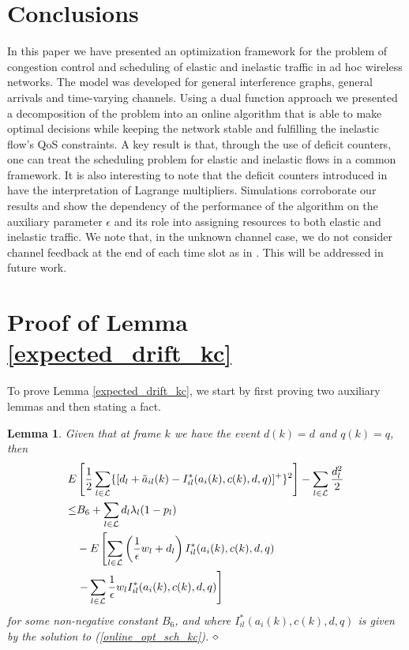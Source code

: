 \documentclass[conference]{IEEEtran}
\newtheorem{lemma}{Lemma}
\begin{document}
\section{Conclusions}

In this paper we have presented an optimization framework for the problem of congestion control and scheduling of elastic and inelastic traffic in ad hoc wireless networks. The model was developed for general interference graphs, general arrivals and time-varying channels. Using a dual function approach we presented a decomposition of the problem into an online algorithm that is able to make optimal decisions while keeping the network stable and fulfilling the inelastic flow's QoS constraints. A key result is that, through the use of deficit counters, one can treat the scheduling problem for elastic and inelastic flows in a common framework. It is also interesting to note that the deficit counters introduced in \cite{Hou09a, Hou09b, Hou09c} have the interpretation of Lagrange multipliers. Simulations corroborate our results and show the dependency of the performance of the algorithm on the auxiliary parameter $\epsilon$ and its role into assigning resources to both elastic and inelastic traffic. We note that, in the unknown channel case, we do not consider channel feedback at the end of each time slot as in \cite{Hou09a, Hou09b, Hou09c}. This will be addressed in future work.

\appendices
\section{Proof of Lemma \ref{expected_drift_kc}}

To prove Lemma \ref{expected_drift_kc}, we start by first proving two auxiliary lemmas and then stating a fact.

\begin{lemma}
\label{bound_d_kc}
Given that at frame $k$ we have the event $d(k)=d$ and $q(k)=q$, then
\begin{align*}
	E & \left[ \frac{1}{2} \sum_{l \in \mathcal{L}} \{ [ d_l + \tilde{a}_{il}(k) - I_{il}^*(a_i(k),c(k),d,q) ]^+ \}^2 \right] - \sum_{l \in \mathcal{L}} \frac{d_l^2}{2} \\
 	\leq & B_6 + \sum_{l \in \mathcal{L}} d_l \lambda_l (1-p_l) \notag \\
 	& - E \left[ \sum_{l \in \mathcal{L}} \left( \frac{1}{\epsilon}w_l + d_l \right) I_{il}^*(a_i(k),c(k),d,q) \right. \notag \\
 	& \left. - \sum_{l \in \mathcal{L}} \frac{1}{\epsilon}w_l I_{il}^*(a_i(k),c(k),d,q) \right] \notag \\
\end{align*}
for some non-negative constant $B_6$, and where $I_{il}^*(a_i(k),c(k),d,q)$ is given by the solution to (\ref{online_opt_sch_kc}).
$\hfill \diamond$
\end{lemma}
\end{document}
